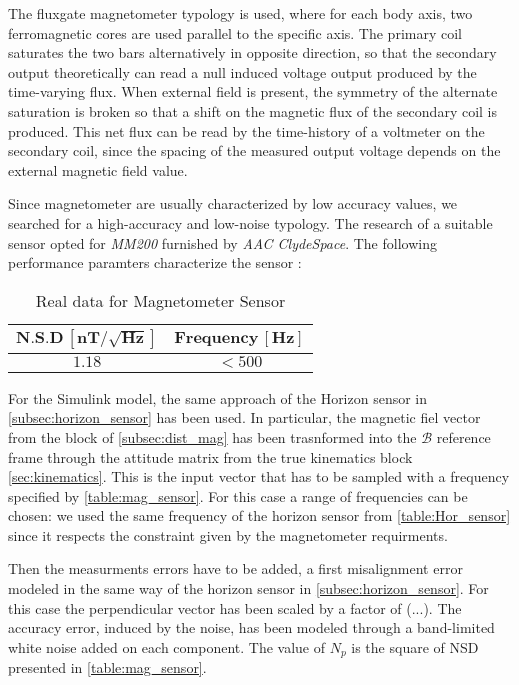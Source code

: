 The fluxgate magnetometer typology is used, where for each body axis, two ferromagnetic cores are used parallel to the specific axis. The primary coil 
saturates the two bars alternatively in opposite direction, so that the secondary output theoretically can read a null induced voltage output produced 
by the time-varying flux. When external field is present, the symmetry of the alternate saturation is broken so that a shift on the magnetic flux of the 
secondary coil is produced. This net flux can be read by the time-history of a voltmeter on the secondary coil, since the spacing of the measured output
voltage depends on the external magnetic field value. 

Since magnetometer are usually characterized by low accuracy values, we searched for a high-accuracy and low-noise typology. The research of a suitable
sensor opted for \textit{MM200} furnished by \textit{AAC ClydeSpace}. The following performance paramters characterize the sensor \cite{magnetometer_site}:

\begin{table}[H]

    \centering
    \begin{tabular}{|c|c|}
    \hline
     $\bm{N.S.D \, [nT/\sqrt{Hz}]}$ & $\bm{Frequency \, [Hz]}$ \\
    \hline
    $1.18$ & $<500$  \\
    \hline
    \end{tabular}
    
    \caption{Real data for Magnetometer Sensor}
    \label{table:mag_sensor}
    
\end{table}

For the Simulink model, the same approach of the Horizon sensor in \autoref{subsec:horizon_sensor} has been used. In particular, the magnetic fiel vector
from the block of \autoref{subsec:dist_mag} has been trasnformed into the $\mathcal{B}$ reference frame through the attitude matrix from the true kinematics 
block \autoref{sec:kinematics}. This is the input vector that has to be sampled with a frequency specified by \autoref{table:mag_sensor}. For this case a range
of frequencies can be chosen: we used the same frequency of the horizon sensor from \autoref{table:Hor_sensor} since it respects the constraint 
given by the magnetometer requirments. 

Then the measurments errors have to be added, a first misalignment error modeled in the same way of the horizon sensor in \autoref{subsec:horizon_sensor}. For this case the perpendicular
vector has been scaled by a factor of (...).
The accuracy error, induced by the noise, has been modeled through a band-limited white noise added on each component. The value of $N_{p}$ is the square of NSD presented in \autoref{table:mag_sensor}.



